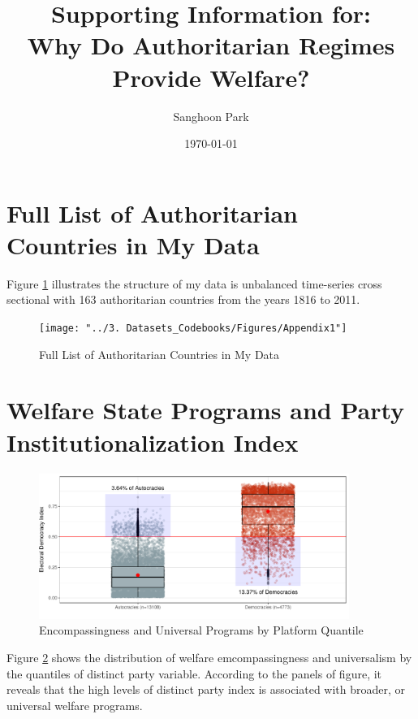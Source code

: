 \documentclass[12pt]{article}
\title{Supporting Information for: \\ Why Do Authoritarian Regimes Provide Welfare?}
\author{Sanghoon Park}
\date{\today}
\begin{document}
\maketitle
\tableofcontents

\newpage
\section{Full List of Authoritarian Countries in My Data}
Figure \ref{fig:figure6} illustrates the structure of my data is unbalanced time-series cross sectional with  163 authoritarian countries from the years 1816 to 2011. 
\begin{figure}[!htbt]
	\centering
	\texttt{[image: "../3. Datasets\_Codebooks/Figures/Appendix1"]}
	\caption{Full List of Authoritarian Countries in My Data}
	\label{fig:figure6}
\end{figure}


\section{Welfare State Programs and Party Institutionalization Index}

\begin{figure}[!ht]
	\centering
	\includegraphics[width=0.9\textwidth]{"../3. Datasets_Codebooks/Figures/Plot1"}
	\caption{Encompassingness and Universal Programs by Platform Quantile}
	\label{fig:figure1}
\end{figure}

Figure \ref{fig:figure1} shows the distribution of welfare emcompassingness and universalism by the quantiles of distinct party variable. According to the panels of figure, it reveals that the high levels of distinct party index is associated with broader, or universal welfare programs.\par
\end{document}
